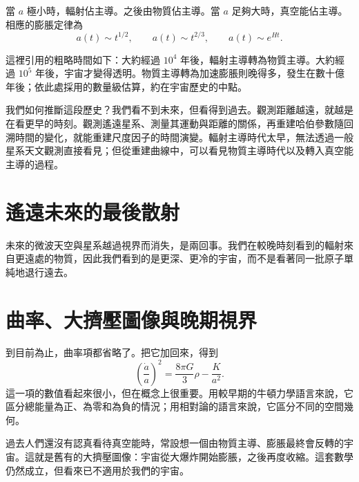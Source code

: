 當 \(a\) 極小時，輻射佔主導。之後由物質佔主導。當 \(a\) 足夠大時，真空能佔主導。相應的膨脹定律為
\begin{equation}
a(t)\sim t^{1/2},
\qquad
a(t)\sim t^{2/3},
\qquad
a(t)\sim e^{Ht}.
\end{equation}

這裡引用的粗略時間如下：大約經過 \(10^4\) 年後，輻射主導轉為物質主導。大約經過 \(10^5\) 年後，宇宙才變得透明。物質主導轉為加速膨脹則晚得多，發生在數十億年後；依此處採用的數量級估算，約在宇宙歷史的中點。

我們如何推斷這段歷史？我們看不到未來，但看得到過去。觀測距離越遠，就越是在看更早的時刻。觀測遙遠星系、測量其運動與距離的關係，再重建哈伯參數隨回溯時間的變化，就能重建尺度因子的時間演變。輻射主導時代太早，無法透過一般星系天文觀測直接看見；但從重建曲線中，可以看見物質主導時代以及轉入真空能主導的過程。

\section{遙遠未來的最後散射}

未來的微波天空與星系越過視界而消失，是兩回事。我們在較晚時刻看到的輻射來自更遠處的物質，因此我們看到的是更深、更冷的宇宙，而不是看著同一批原子單純地退行遠去。

\begin{classroomqa}
\end{classroomqa}

\section{曲率、大擠壓圖像與晚期視界}

到目前為止，曲率項都省略了。把它加回來，得到
\begin{equation}
\left(\frac{\dot a}{a}\right)^2
=
\frac{8\pi G}{3}\rho
-
\frac{K}{a^2}.
\end{equation}
這一項的數值看起來很小，但在概念上很重要。用較早期的牛頓力學語言來說，它區分總能量為正、為零和為負的情況；用相對論的語言來說，它區分不同的空間幾何。

過去人們還沒有認真看待真空能時，常設想一個由物質主導、膨脹最終會反轉的宇宙。這就是舊有的大擠壓圖像：宇宙從大爆炸開始膨脹，之後再度收縮。這套數學仍然成立，但看來已不適用於我們的宇宙。

